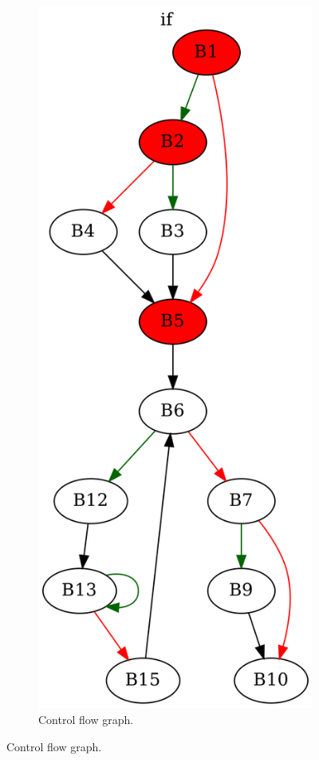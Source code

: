 \documentclass[aspectratio=1610]{beamer}
\begin{document}
\begin{frame}[noframenumbering]
\begin{figure}[htbp]
\begin{subfigure}[b]{0.50\textwidth}
			\includegraphics[height=0.6\paperheight]{inc/methods/interval/example/sample/f_0005a.png}
			\caption{Control flow graph.}
		\end{subfigure}
	\end{figure}
\end{frame}
\end{document}
